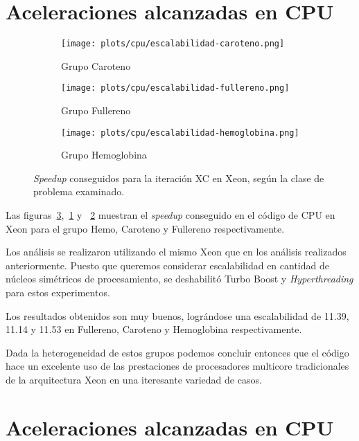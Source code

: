 \section{Aceleraciones alcanzadas en CPU}

\begin{figure}[htbp]
\centering
\begin{subfigure}[b]{\plotwidthtres}
   \texttt{[image: plots/cpu/escalabilidad-caroteno.png]}
   \caption{Grupo Caroteno}
   \label{fig:cpu-scalability-caroteno}
 \end{subfigure}
\begin{subfigure}[b]{\plotwidthtres}
   \texttt{[image: plots/cpu/escalabilidad-fullereno.png]}
   \caption{Grupo Fullereno}
   \label{fig:cpu-scalability-fullereno}
 \end{subfigure}
\begin{subfigure}[b]{\plotwidthtres}
   \texttt{[image: plots/cpu/escalabilidad-hemoglobina.png]}
   \caption{Grupo Hemoglobina}
   \label{fig:cpu-scalability-hemo}
 \end{subfigure}
 \caption{\textit{Speedup} conseguidos para la iteraci\'on XC en Xeon, seg\'un
 la clase de problema examinado.}
 \label{fig:cpu-scalability}
\end{figure}

Las figuras~\ref{fig:cpu-scalability-hemo},~\ref{fig:cpu-scalability-caroteno} y
~\ref{fig:cpu-scalability-fullereno} muestran el \textit{speedup} conseguido en
el c\'odigo de CPU en Xeon para el grupo Hemo, Caroteno y Fullereno respectivamente.

Los an\'alisis se realizaron utilizando el mismo Xeon que en los an\'alisis
realizados anteriormente. Puesto que queremos considerar escalabilidad en cantidad
de n\'ucleos sim\'etricos de procesamiento, se deshabilit\'o Turbo Boost y
\textit{Hyperthreading} para estos experimentos.

Los resultados obtenidos son muy buenos, logr\'andose una escalabilidad de 11.39,
11.14 y 11.53 en Fullereno, Caroteno y Hemoglobina respectivamente.

Dada la heterogeneidad de estos grupos podemos concluir entonces que el c\'odigo
hace un excelente uso de las prestaciones de procesadores multicore tradicionales
de la arquitectura Xeon en una iteresante variedad de casos.

\section{Aceleraciones alcanzadas en CPU}

